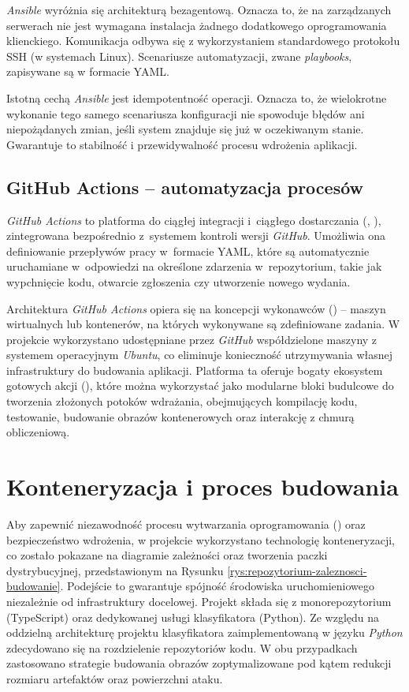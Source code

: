 \textit{Ansible} wyróżnia się architekturą bezagentową. Oznacza to, że na zarządzanych serwerach nie jest wymagana instalacja żadnego dodatkowego oprogramowania klienckiego. Komunikacja odbywa się z wykorzystaniem standardowego protokołu SSH (w systemach Linux). Scenariusze automatyzacji, zwane \textit{playbooks}, zapisywane są w formacie YAML.

Istotną cechą \textit{Ansible} jest idempotentność operacji. Oznacza to, że wielokrotne wykonanie tego samego scenariusza konfiguracji nie spowoduje błędów ani niepożądanych zmian, jeśli system znajduje się już w oczekiwanym stanie. Gwarantuje to stabilność i przewidywalność procesu wdrożenia aplikacji.

\subsection{GitHub Actions -- automatyzacja procesów}

\textit{GitHub Actions} \cite{gha} to platforma do ciągłej integracji i~ciągłego dostarczania (, ), zintegrowana bezpośrednio z~systemem kontroli wersji \textit{GitHub}. Umożliwia ona definiowanie przepływów pracy w~formacie YAML, które są automatycznie uruchamiane w~odpowiedzi na określone zdarzenia w~repozytorium, takie jak wypchnięcie kodu, otwarcie zgłoszenia czy utworzenie nowego wydania.

Architektura \textit{GitHub Actions} opiera się na koncepcji wykonawców () -- maszyn wirtualnych lub kontenerów, na których wykonywane są zdefiniowane zadania. W projekcie wykorzystano udostępniane przez \textit{GitHub} współdzielone maszyny z systemem operacyjnym \textit{Ubuntu}, co eliminuje konieczność utrzymywania własnej infrastruktury do budowania aplikacji. Platforma ta oferuje bogaty ekosystem gotowych akcji (), które można wykorzystać jako modularne bloki budulcowe do tworzenia złożonych potoków wdrażania, obejmujących kompilację kodu, testowanie, budowanie obrazów kontenerowych oraz interakcję z chmurą obliczeniową.

\section{Konteneryzacja i proces budowania}

Aby zapewnić niezawodność procesu wytwarzania oprogramowania () oraz bezpieczeństwo wdrożenia, w projekcie wykorzystano technologię konteneryzacji, co zostało pokazane na diagramie zależności oraz tworzenia paczki dystrybucyjnej, przedstawionym na Rysunku \ref{rys:repozytorium-zaleznosci-budowanie}. Podejście to gwarantuje spójność środowiska uruchomieniowego niezależnie od infrastruktury docelowej. Projekt składa się z monorepozytorium (TypeScript) oraz dedykowanej usługi klasyfikatora (Python). Ze względu na oddzielną architekturę projektu klasyfikatora zaimplementowaną w języku \textit{Python} zdecydowano się na rozdzielenie repozytoriów kodu. W obu przypadkach zastosowano strategie budowania obrazów zoptymalizowane pod kątem redukcji rozmiaru artefaktów oraz powierzchni ataku.

